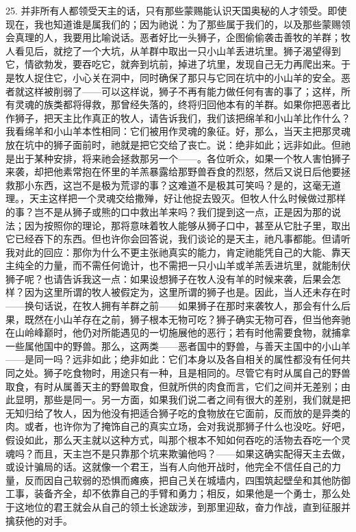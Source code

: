 25. 并非所有人都领受天主的话，只有那些蒙赐能认识天国奥秘的人才领受。即使现在，我也知道谁是属我们的；因为祂说：为了那些属于我们的，以及那些蒙赐领会真理的人，我要用比喻说话。恶者好比一头狮子，企图偷偷袭击善牧的羊群；牧人看见后，就挖了一个大坑，从羊群中取出一只小山羊丢进坑里。狮子渴望得到它，情欲勃发，要吞吃它，就奔到坑前，掉进了坑里，发现自己无力再爬出来。于是牧人捉住它，小心关在洞中，同时确保了那只与它同在坑中的小山羊的安全。恶者就这样被削弱了——可以这样说，狮子不再有能力做任何有害的事了；这样，所有灵魂的族类都将得救，那曾经失落的，终将归回他本有的羊群。如果你把恶者比作狮子，把天主比作真正的牧人，请告诉我们，我们该把绵羊和小山羊比作什么？我看绵羊和小山羊本性相同：它们被用作灵魂的象征。好，那么，当天主把那灵魂放在坑中的狮子面前时，祂就是把它交给了丧亡。说：绝非如此；远非如此。但祂是出于某种安排，将来祂会拯救那另一个——。各位听众，如果一个牧人害怕狮子来袭，却把他素常抱在怀里的羊羔暴露给那野兽吞食的烈怒，然后又说日后他要拯救那小东西，这岂不是极为荒谬的事？这难道不是极其可笑吗？是的，这毫无道理。，天主这样把一个灵魂交给撒殚，好让他捉去毁灭。但牧人什么时候做过那样的事？岂不是从狮子或熊的口中救出羊来吗？我们提到这一点，正是因为那的说法；因为按照你的理论，那将意味着牧人能够从狮子口中，甚至从它肚子里，取出它已经吞下的东西。但也许你会回答说，我们谈论的是天主，祂凡事都能。但请听我对此的回应：那你为什么不更主张祂真实的能力，肯定祂能凭自己的大能、靠天主纯全的力量，而不需任何诡计，也不需把一只小山羊或羊羔丢进坑里，就能制伏狮子呢？也请告诉我这一点：如果设想狮子在牧人没有羊的时候来袭，后果会怎样？因为这里所谓的牧人被假定为，这里所谓的狮子也是。因此，当人还未存在时——换句话说，在牧人拥有羊群之前——如果狮子在那时来袭牧人，那会有什么后果，既然在小山羊存在之前，狮子根本无物可吃？狮子确实无物可吞，但当他奔驰在山岭峰巅时，他仍对所能遇见的一切施展他的恶行；若有时他需要食物，就捕拿一些属他国中的野兽。那么，这两类——恶者国中的野兽，与善天主国中的小山羊——是同一吗？远非如此；绝非如此：它们本身以及各自相关的属性都没有任何共同之处。狮子吃食物时，用途只有一种，且是相同的。尽管它有时从属自己的野兽取食，有时从属善天主的野兽取食，但就所供的肉食而言，它们之间并无差别；由此显明，那些是同一。另一方面，如果我们说二者之间有很大的差别，我们就是把无知归给了牧人，因为他没有把适合狮子吃的食物放在它面前，反而放的是异类的肉。或者，也许你为了掩饰自己的真实立场，会对我说那狮子什么也没吃。好吧，假设如此，那么天主就以这种方式，叫那个根本不知如何吞吃的活物去吞吃一个灵魂吗？而且，天主岂不是只靠那个坑来欺骗他吗？——如果这确实配得天主去做，或设计骗局的话。这就像一个君王，当有人向他开战时，他完全不信任自己的力量，反而因自己软弱的恐惧而瘫痪，把自己关在城墙内，四围筑起壁垒和其他防御工事，装备齐全，却不依靠自己的手臂和勇力；相反，如果他是一个勇士，那么处于这地位的君王就会从自己的领土长途跋涉，到那里迎敌，奋力作战，直到征服并擒获他的对手。\par

